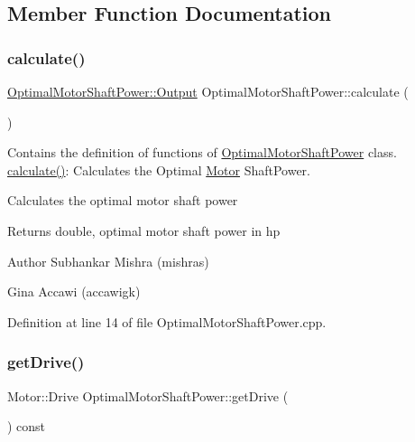 \subsection{Member Function Documentation}
\mbox{\label{class_optimal_motor_shaft_power_a486edea429b828e5d989fb32034f4059}} 
\subsubsection{\texorpdfstring{calculate()}{calculate()}}
{\footnotesize\ttfamily \hyperlink{struct_optimal_motor_shaft_power_1_1_output}{Optimal\+Motor\+Shaft\+Power\+::\+Output} Optimal\+Motor\+Shaft\+Power\+::calculate (\begin{DoxyParamCaption}{ }\end{DoxyParamCaption})}



Contains the definition of functions of \hyperlink{class_optimal_motor_shaft_power}{Optimal\+Motor\+Shaft\+Power} class. \hyperlink{class_optimal_motor_shaft_power_a486edea429b828e5d989fb32034f4059}{calculate()}\+: Calculates the Optimal \hyperlink{struct_motor}{Motor} Shaft\+Power. 

Calculates the optimal motor shaft power \begin{DoxyReturn}{Returns}
double, optimal motor shaft power in hp
\end{DoxyReturn}
\begin{DoxyAuthor}{Author}
Subhankar Mishra (mishras) 

Gina Accawi (accawigk) 
\end{DoxyAuthor}


Definition at line 14 of file Optimal\+Motor\+Shaft\+Power.\+cpp.

\mbox{\label{class_optimal_motor_shaft_power_a3cc369285d8b3582fcd8c44e5a1c37c8}} 
\subsubsection{\texorpdfstring{get\+Drive()}{getDrive()}}
{\footnotesize\ttfamily Motor\+::\+Drive Optimal\+Motor\+Shaft\+Power\+::get\+Drive (\begin{DoxyParamCaption}{ }\end{DoxyParamCaption}) const\hspace{0.3cm}{\ttfamily [inline]}}

